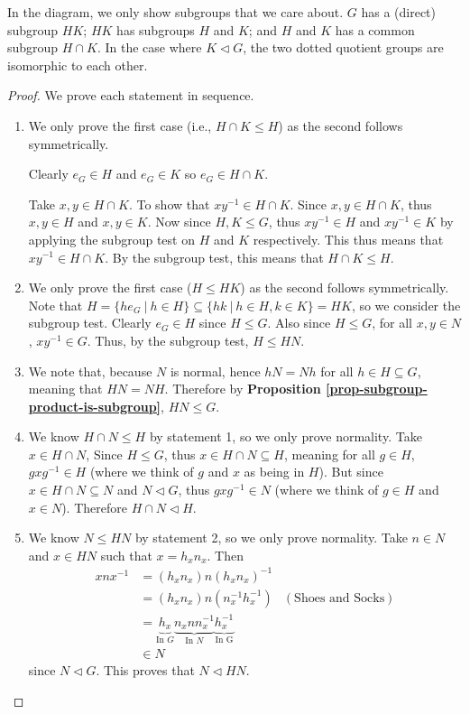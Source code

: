 In the diagram, we only show subgroups that we care about. $G$ has a (direct) subgroup $HK$; $HK$ has subgroups $H$ and $K$; and $H$ and $K$ has a common subgroup $H\cap K$. In the case where $K \lhd G$, the two dotted quotient groups are isomorphic to each other.

\begin{proof}
    We prove each statement in sequence.

    \begin{enumerate}
        \item We only prove the first case (i.e., $H \cap K \leq H$) as the second follows symmetrically.
        
        Clearly $e_G \in H$ and $e_G \in K$ so $e_G \in H \cap K$.
        
        Take $x, y \in H \cap K$. To show that $xy^{-1} \in H \cap K$. Since $x, y \in H \cap K$, thus $x, y \in H$ and $x, y \in K$. Now since $H, K \leq G$, thus $xy^{-1} \in H$ and $xy^{-1} \in K$ by applying the subgroup test on $H$ and $K$ respectively. This thus means that $xy^{-1} \in H \cap K$. By the subgroup test, this means that $H \cap K \leq H$.
        
        \item We only prove the first case ($H \leq HK$) as the second follows symmetrically. Note that $H = \{he_G \ | \ h \in H\} \subseteq \{hk \ | \ h \in H, k \in K\} = HK$, so we consider the subgroup test. Clearly $e_G \in H$ since $H \leq G$. Also since $H \leq G$, for all $x, y \in N$, $xy^{-1} \in G$. Thus, by the subgroup test, $H \leq HN$.
        
        \item We note that, because $N$ is normal, hence $hN = Nh$ for all $h \in H \subseteq G$, meaning that $HN = NH$. Therefore by \textbf{Proposition \ref{prop-subgroup-product-is-subgroup}}, $HN \leq G$.

        \item We know $H \cap N \leq H$ by statement 1, so we only prove normality. Take $x \in H \cap N$, Since $H \leq G$, thus $x \in H \cap N \subseteq H$, meaning for all $g \in H$, $gxg^{-1} \in H$ (where we think of $g$ and $x$ as being in $H$). But since $x \in H \cap N \subseteq N$ and $N \lhd G$, thus $gxg^{-1} \in N$ (where we think of $g \in H$ and $x \in N$). Therefore $H \cap N \lhd H$.

        \item We know $N \leq HN$ by statement 2, so we only prove normality. Take $n \in N$ and $x \in HN$ such that $x = h_xn_x$. Then
        \begin{align*}
            xnx^{-1} &= (h_xn_x)n(h_xn_x)^{-1}\\
            &= (h_xn_x)n(n_x^{-1}h_x^{-1}) & (\text{Shoes and Socks})\\
            &= \underbrace{h_x}_{\text{In }G}\underbrace{n_xnn_x^{-1}}_{\text{In }N}\underbrace{h_x^{-1}}_{\text{In G}}\\
            &\in N
        \end{align*}
        since $N \lhd G$. This proves that $N \lhd HN$.


\end{enumerate}
\end{proof}
